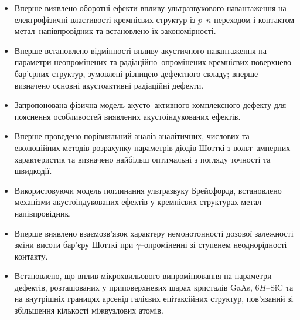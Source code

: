\begin{itemize}[leftmargin=0em,itemindent=1.5em]
\renewcommand{\labelitemi}{$\bullet$}
  \item Вперше виявлено оборотні ефекти впливу ультразвукового навантаження на електрофізичні
   властивості кремнієвих структур із $p$--$n$ переходом і контактом метал--напівпровідник
   та встановлено їх закономірності.

  \item Вперше встановлено відмінності впливу акустичного навантаження на параметри неопромінених та радіаційно--опромінених кремнієвих поверхнево--бар'єрних структур,
  зумовлені різницею дефектного складу;
      вперше визначено основні акустоактивні радіаційні дефекти.

  \item Запропонована фізична модель акусто--активного комплексного дефекту для пояснення особливостей виявлених акустоіндукованих ефектів.

  \item Вперше проведено порівняльний аналіз аналітичних, числових та еволюційних методів розрахунку параметрів діодів Шотткі з вольт--амперних характеристик та визначено найбільш оптимальні з погляду точності та швидкодії.

  \item Використовуючи модель поглинання ультразвуку Брейсфорда, встановлено механізми акустоіндукованих ефектів у кремнієвих структурах метал--напівпровідник.


  \item Вперше виявлено  взаємозв'язок характеру немонотонності дозової залежності зміни висоти бар'єру Шотткі при $\gamma$--опроміненні зі ступенем неоднорідності контакту.

  \item Встановлено, що  вплив мікрохвильового випромінювання на параметри дефектів, розташованих у приповерхневих шарах кристалів GaAs, 6$H$--SiC та на внутрішніх границях арсенід галієвих епітаксійних структур, пов'язаний зі збільшення кількості міжвузлових атомів.

\end{itemize}



